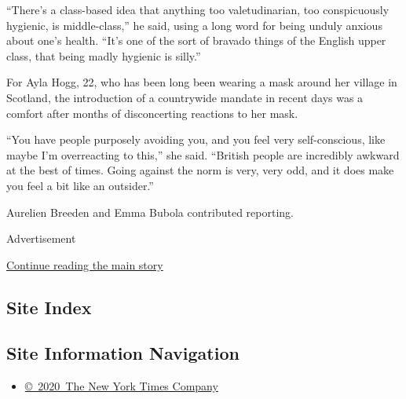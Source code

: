 ``There's a class-based idea that anything too valetudinarian, too
conspicuously hygienic, is middle-class,'' he said, using a long word
for being unduly anxious about one's health. ``It's one of the sort of
bravado things of the English upper class, that being madly hygienic is
silly.''

For Ayla Hogg, 22, who has been long been wearing a mask around her
village in Scotland, the introduction of a countrywide mandate in recent
days was a comfort after months of disconcerting reactions to her mask.

``You have people purposely avoiding you, and you feel very
self-conscious, like maybe I'm overreacting to this,'' she said.
``British people are incredibly awkward at the best of times. Going
against the norm is very, very odd, and it does make you feel a bit like
an outsider.''

Aurelien Breeden and Emma Bubola contributed reporting.

Advertisement

\protect\hyperlink{after-bottom}{Continue reading the main story}

\hypertarget{site-index}{%
\subsection{Site Index}\label{site-index}}

\hypertarget{site-information-navigation}{%
\subsection{Site Information
Navigation}\label{site-information-navigation}}

\begin{itemize}
\tightlist
\item
  \href{https://help.nytimes.com/hc/en-us/articles/115014792127-Copyright-notice}{©~2020~The
  New York Times Company}
\end{itemize}

